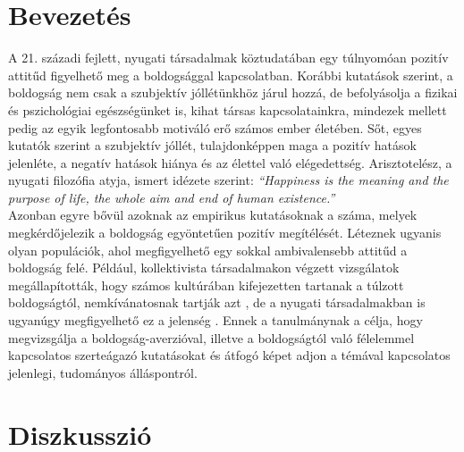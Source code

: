 \section{Bevezetés}
A 21. századi fejlett, nyugati társadalmak köztudatában egy túlnyomóan pozitív attitűd figyelhető meg a boldogsággal kapcsolatban. Korábbi kutatások szerint, a boldogság nem csak a szubjektív jóllétünkhöz járul hozzá, de befolyásolja a fizikai és pszichológiai egészségünket is, kihat társas kapcsolatainkra, mindezek mellett pedig az egyik legfontosabb motiváló erő számos ember életében. Sőt, egyes kutatók szerint a szubjektív jóllét, tulajdonképpen maga a pozitív hatások jelenléte, a negatív hatások hiánya és az élettel való elégedettség.\cite{diener_suh_lucas_smith_1999} Arisztotelész, a nyugati filozófia atyja, ismert idézete szerint: \textit{“Happiness is the meaning and the purpose of life, the whole aim and end of human existence.”} \medskip 
\\ Azonban egyre bővül azoknak az empirikus kutatásoknak a száma, melyek megkérdő\-jelezik  a boldogság egyöntetűen pozitív megítélését. Léteznek ugyanis olyan populációk, ahol megfigyelhető egy sokkal ambivalensebb attitűd a boldogság felé. Például, kollektivista társadalmakon végzett vizsgálatok megállapították, hogy számos kultúrá\-ban kifejezetten tartanak a túlzott boldogságtól, nemkívánatosnak tartják azt \cite{joshanloo_weijers_2013} \cite{joshanloo_lepshokova_panyusheva_natalia_poon_yeung_sundaram_achoui_asano_igarashi}, de a nyugati társadalmakban is ugyanúgy megfigyelhető ez a jelenség \cite{gilbert_mcewan_catarino_baiao_palmeira_2013}.  Ennek a tanulmánynak a célja, hogy megvizsgálja a boldogság-averzióval, illetve a boldogságtól való félelemmel kapcsolatos szerteágazó kutatásokat és átfogó képet adjon a témával kapcsolatos jelenlegi, tudományos álláspontról. \medskip 

\pagebreak
\section {Diszkusszió}
